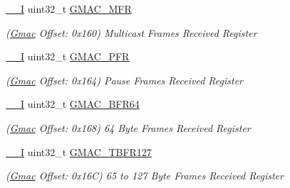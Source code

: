 \begin{DoxyCompactItemize}
\mbox{\label{structGmac_a6ece168ffcee5e556ea8fbe220bc6746}} 
\mbox{\hyperlink{core__cm7_8h_af63697ed9952cc71e1225efe205f6cd3}{\+\_\+\+\_\+I}} uint32\+\_\+t \mbox{\hyperlink{structGmac_a6ece168ffcee5e556ea8fbe220bc6746}{G\+M\+A\+C\+\_\+\+M\+FR}}
\begin{DoxyCompactList}\small\item\em (\mbox{\hyperlink{structGmac}{Gmac}} Offset\+: 0x160) Multicast Frames Received Register \end{DoxyCompactList}\item 
\mbox{\label{structGmac_ab1e73bcdd08cd171b23c168557c731da}} 
\mbox{\hyperlink{core__cm7_8h_af63697ed9952cc71e1225efe205f6cd3}{\+\_\+\+\_\+I}} uint32\+\_\+t \mbox{\hyperlink{structGmac_ab1e73bcdd08cd171b23c168557c731da}{G\+M\+A\+C\+\_\+\+P\+FR}}
\begin{DoxyCompactList}\small\item\em (\mbox{\hyperlink{structGmac}{Gmac}} Offset\+: 0x164) Pause Frames Received Register \end{DoxyCompactList}\item 
\mbox{\label{structGmac_a3abb5ad9bb6edb8679e839f61cf0b686}} 
\mbox{\hyperlink{core__cm7_8h_af63697ed9952cc71e1225efe205f6cd3}{\+\_\+\+\_\+I}} uint32\+\_\+t \mbox{\hyperlink{structGmac_a3abb5ad9bb6edb8679e839f61cf0b686}{G\+M\+A\+C\+\_\+\+B\+F\+R64}}
\begin{DoxyCompactList}\small\item\em (\mbox{\hyperlink{structGmac}{Gmac}} Offset\+: 0x168) 64 Byte Frames Received Register \end{DoxyCompactList}\item 
\mbox{\label{structGmac_a4223c3ed897f988d8f135d40743187bb}} 
\mbox{\hyperlink{core__cm7_8h_af63697ed9952cc71e1225efe205f6cd3}{\+\_\+\+\_\+I}} uint32\+\_\+t \mbox{\hyperlink{structGmac_a4223c3ed897f988d8f135d40743187bb}{G\+M\+A\+C\+\_\+\+T\+B\+F\+R127}}
\begin{DoxyCompactList}\small\item\em (\mbox{\hyperlink{structGmac}{Gmac}} Offset\+: 0x16C) 65 to 127 Byte Frames Received Register \end{DoxyCompactList}\item 
\mbox{\label{structGmac_ac0f973c8ea5412c3445ec37a342e0762}} 

\end{DoxyCompactItemize}
